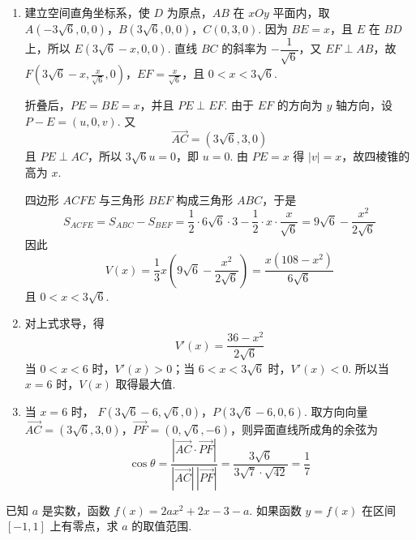 \begin{solution}
\begin{enumerate}
\item 建立空间直角坐标系，使 \(D\) 为原点，\(AB\) 在 \(xOy\) 平面内，取 \(A(-3\sqrt6,0,0)\)，\(B(3\sqrt6,0,0)\)，\(C(0,3,0)\).
因为 \(BE=x\)，且 \(E\) 在 \(BD\) 上，所以 \(E(3\sqrt6-x,0,0)\). 直线 \(BC\) 的斜率为 \(-\dfrac{1}{\sqrt6}\)，又 \(EF\perp AB\)，故 \(F\left(3\sqrt6-x,\frac{x}{\sqrt6},0\right)\)，\(EF=\frac{x}{\sqrt6}\)，且 \(0<x<3\sqrt6\).

折叠后，\(PE=BE=x\)，并且 \(PE\perp EF\). 由于 \(EF\) 的方向为 \(y\) 轴方向，设 \(P-E=(u,0,v)\). 又
\[
\overrightarrow{AC}=(3\sqrt6,3,0)
\]
且 \(PE\perp AC\)，所以 \(3\sqrt6u=0\)，即 \(u=0\). 由 \(PE=x\) 得 \(|v|=x\)，故四棱锥的高为 \(x\).

四边形 \(ACFE\) 与三角形 \(BEF\) 构成三角形 \(ABC\)，于是
\[
S_{ACFE}=S_{ABC}-S_{BEF}=\frac12\cdot6\sqrt6\cdot3-\frac12\cdot x\cdot\frac{x}{\sqrt6}=9\sqrt6-\frac{x^2}{2\sqrt6}
\]
因此
\[
V(x)=\frac13x\left(9\sqrt6-\frac{x^2}{2\sqrt6}\right)=\frac{x(108-x^2)}{6\sqrt6}
\]
且 \(0<x<3\sqrt6\).

\item 对上式求导，得
\[
V'(x)=\frac{36-x^2}{2\sqrt6}
\]
当 \(0<x<6\) 时，\(V'(x)>0\)；当 \(6<x<3\sqrt6\) 时，\(V'(x)<0\). 所以当 \(x=6\) 时，\(V(x)\) 取得最大值.

\item 当 \(x=6\) 时，
\(F\left(3\sqrt6-6,\sqrt6,0\right)\)，\(P\left(3\sqrt6-6,0,6\right)\).
取方向向量 \(\overrightarrow{AC}=(3\sqrt6,3,0)\)，\(\overrightarrow{PF}=(0,\sqrt6,-6)\)，则异面直线所成角的余弦为
\[
\cos\theta=\frac{|\overrightarrow{AC}\cdot\overrightarrow{PF}|}{|\overrightarrow{AC}|\,|\overrightarrow{PF}|}=\frac{3\sqrt6}{3\sqrt7\cdot\sqrt{42}}=\frac17
\]
\end{enumerate}
\end{solution}

\begin{problem}
已知 \(a\) 是实数，函数 \(f(x) = 2ax^2 + 2x - 3 - a\). 如果函数 \(y = f(x)\) 在区间 \([-1, 1]\) 上有零点，求 \(a\) 的取值范围.
\end{problem}

